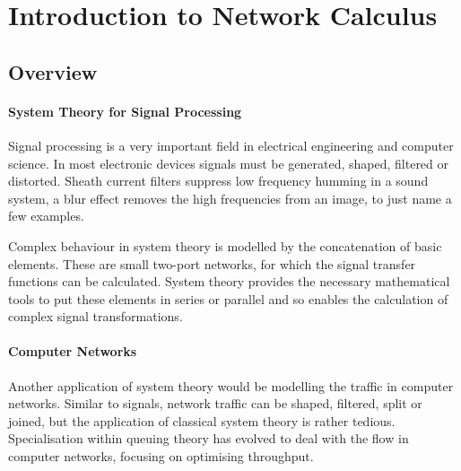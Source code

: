\section{Introduction to Network Calculus}

\subsection{Overview}

\paragraph{System Theory for Signal Processing} Signal processing is a very important field in electrical engineering and computer science.
In most electronic devices signals must be generated, shaped, filtered or distorted. Sheath current filters suppress low frequency humming in a sound system,
a blur effect removes the high frequencies from an image, to just name a few examples.
\par
Complex behaviour in system theory is modelled by the concatenation of basic elements. These are small two-port networks, for which the signal transfer functions can be calculated.
System theory provides the necessary mathematical tools to put these elements in series or parallel and so enables the calculation of complex signal transformations.
\paragraph{Computer Networks} Another application of system theory would be modelling the traffic in computer networks.
Similar to signals, network traffic can be shaped, filtered, split or joined, but the application of classical system theory
is rather tedious. Specialisation within queuing theory has evolved
to deal with the flow in computer networks, focusing on optimising throughput.
%

